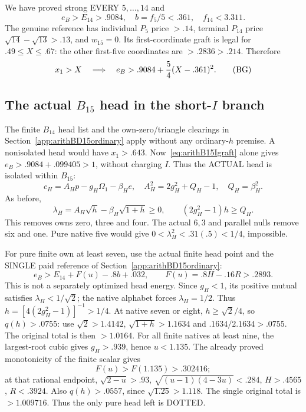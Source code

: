 \documentclass[11pt]{article}
\begin{document}
We have proved strong EVERY \(5,\ldots,14\) and
\[
 e_B>E_{14}>.9084,\quad
 b=f_5/5<.361,\quad f_{14}<3.311 .
\tag{BW}\label{eq:arithB15Iwindow}
\]
The genuine reference has individual \(P_5\) price
\(>.14\), terminal \(P_{14}\) price
\(\sqrt{14}-\sqrt{13}>.13\), and \(w_{15}=0\).
Its first-coordinate graft is legal for
\(.49\le X\le.67\): the other first-five coordinates
are \(>.2836>.214\).
Therefore
\[
             x_1>X\quad\Longrightarrow\quad
             e_B>.9084+{5\over4}(X-.361)^2 .
\tag{BG}\label{eq:arithB15Igraft}
\]

\subsection{The actual \(B_{15}\) head in the short-\(I\) branch}
\label{app:arithB15Ihead}

The finite \(B_{14}\) head list and the own-zero/triangle
clearings in Section~\ref{app:arithBD15ordinary} apply
without any ordinary-\(h\) premise.
A nonisolated head would have \(x_1>.643\).
Now~\eqref{eq:arithB15Igraft} alone gives
\(e_B>.9084+.099405>1\), without charging \(I\).
Thus the ACTUAL head is isolated within \(B_{15}\):
\[
 c_H=A_Hp-g_H\Omega_1-\beta_H e,\quad
 A_H^2=2g_H^2+Q_H-1,\quad Q_H=\beta_H^2 .
\]
As before,
\[
 \lambda_H=A_H\sqrt h-\beta_H\sqrt{1+h}\ge0,\qquad
               (2g_H^2-1)h\ge Q_H .
\]
This removes owns zero, three and four.
The actual \(6,3\) and parallel nulls remove six and one.
Pure native five would give
\(0<\lambda_H^2<.31(.5)<1/4\), impossible.

For pure finite own at least seven, use the actual
finite head point and the SINGLE paid reference
of Section~\ref{app:arithBD15ordinary}:
\[
                e_B>E_{14}+F(u)-.8b+.032,\qquad
                F(u)=.8H-.16R>.2893 .
\]
This is not a separately optimized head energy.
Since \(g_H<1\), its positive mutual satisfies
\(\lambda_H<1/\sqrt2\); the native alphabet forces
\(\lambda_H=1/2\).
Thus \(h=[4(2g_H^2-1)]^{-1}>1/4\).
At native seven or eight,
\(h\ge\sqrt2/4\), so \(q(h)>.0755\):
use \(\sqrt2>1.4142\), \(\sqrt{1+h}>1.1634\)
and \(.1634/2.1634>.0755\).
The original total is then \(>1.0164\).
For all finite natives at least nine,
the largest-root cubic gives \(g_H>.939\), hence \(u<1.135\).
The already proved monotonicity of the finite scalar gives
\[
 F(u)>F(1.135)>.302416;
\]
at that rational endpoint,
\(\sqrt{2-u}>.93\), \(\sqrt{(u-1)(4-3u)}<.284\),
\(H>.4565\), \(R<.3924\).
Also \(q(h)>.0557\), since \(\sqrt{1.25}>1.118\).
The single original total is \(>1.009716\).
Thus the only pure head left is DOTTED.
\end{document}
